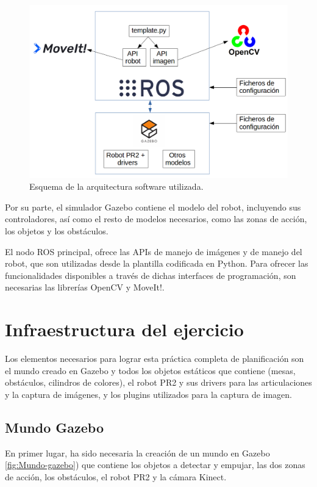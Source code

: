 \documentclass[12pt,spanish,chapterprefix, numbers=noenddot]{book}
\numberwithin{equation}{section}
\numberwithin{figure}{section}
\begin{document}
\begin{figure}[hbt!]
\centering
\includegraphics[width=12cm]{Figs/tfg_schema.png}
\par
\caption{\label{fig:tfg_schema}Esquema de la arquitectura software utilizada.}
\end{figure}

Por su parte, el simulador Gazebo contiene el modelo del robot, incluyendo sus controladores, así como el resto de modelos necesarios, como las zonas de acción, los objetos y los obstáculos.  

El nodo ROS principal, ofrece las APIs de manejo de imágenes y de manejo del robot, que son utilizadas desde la plantilla codificada en Python. Para ofrecer las funcionalidades disponibles a través de dichas interfaces de programación, son necesarias las librerías OpenCV y MoveIt!.

\section{Infraestructura del ejercicio}
Los elementos necesarios para lograr esta práctica completa de planificación son el mundo creado en Gazebo y todos los objetos estáticos que contiene (mesas, obstáculos, cilindros de colores), el robot PR2 y sus drivers para las articulaciones y la captura de imágenes, y los plugins utilizados para la captura de imagen.  

\subsection{Mundo Gazebo}
En primer lugar, ha sido necesaria la creación de un mundo en Gazebo \ref{fig:Mundo-gazebo}) que contiene los objetos a detectar y empujar, las dos zonas de acción, los obstáculos, el robot PR2 y la cámara Kinect.
\end{document}
